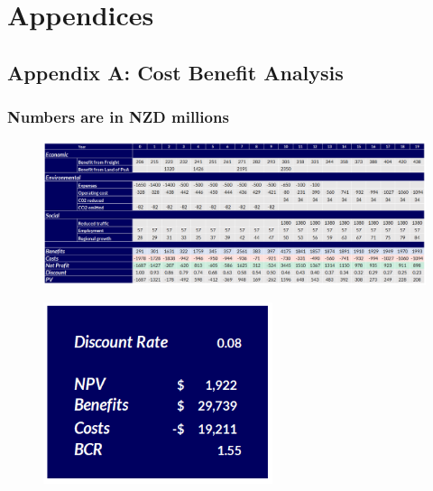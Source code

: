 \newpage
\section{Appendices}

\vspace{5mm}

\subsection*{Appendix A: Cost Benefit Analysis}
\subsubsection*{Numbers are in NZD millions}
\begin{figure}
\centering
\centering
\includegraphics[width=\textwidth]{NPV_Working.png}
\end{figure}

\begin{flushleft}
\begin{figure}

\centering
\includegraphics[width=0.6\textwidth]{NPV_Summary.png}
\end{figure}

\end{flushleft}

\clearpage